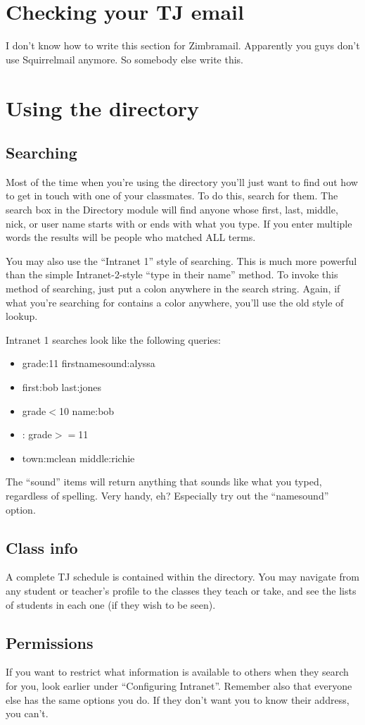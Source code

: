 \documentclass[11pt,letterpaper]{report}
\begin{document}
\section{Checking your TJ email}
I don't know how to write this section for Zimbramail.  Apparently you guys don't use Squirrelmail anymore.  So somebody else write this.
\section{Using the directory}
\subsection{Searching}
Most of the time when you're using the directory you'll just want to find out 
how to get in touch with one of your classmates.  To do this, search for them.
The search box in the Directory module will find anyone whose first, last, middle,
nick, or user name starts with or ends with what you type.  If you enter multiple
words the results will be people who matched ALL terms.

You may also use the ``Intranet 1'' style of searching.  This is much more powerful
than the simple Intranet-2-style ``type in their name'' method.  To invoke this method
of searching, just put a colon anywhere in the search string.  Again, if what you're
searching for contains a color anywhere, you'll use the old style of lookup.

Intranet 1 searches look like the following queries:
\begin{itemize}
	\item grade:11 firstnamesound:alyssa
	\item first:bob last:jones
	\item grade$<$10 name:bob
	\item : grade$>=$11
	\item town:mclean middle:richie
\end{itemize}
The ``sound'' items will return anything that sounds like what you typed, 
regardless of spelling.  Very handy, eh? Especially try out the ``namesound'' 
option.
\subsection{Class info}
A complete TJ schedule is contained within the directory.  You may navigate
from any student or teacher's profile to the classes they teach or take,
and see the lists of students in each one (if they wish to be seen).
\subsection{Permissions}
If you want to restrict what information is available to others when they search
for you, look earlier under ``Configuring Intranet''.  Remember also that
everyone else has the same options you do.  If they don't want you to know their
address, you can't.
\end{document}
